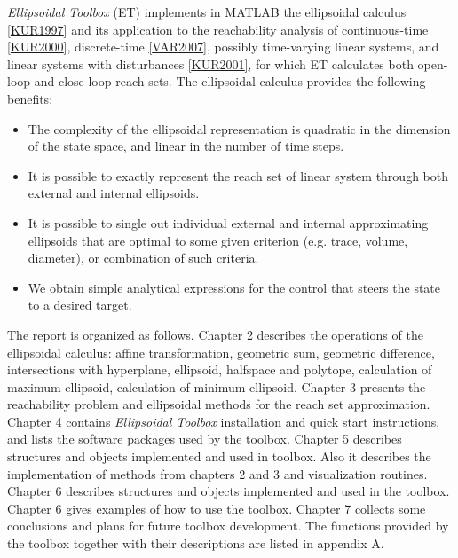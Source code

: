 \documentclass[letterpaper,10pt,english]{sphinxmanual}
\begin{document}
\emph{Ellipsoidal Toolbox} (ET) implements in MATLAB the ellipsoidal calculus
{\hyperref[chap_intro:kur1997]{{[}KUR1997{]}}} and its application to the reachability
analysis of continuous-time {\hyperref[chap_intro:kur2000]{{[}KUR2000{]}}}, discrete-time
{\hyperref[chap_reach:var2007]{{[}VAR2007{]}}}, possibly time-varying linear systems, and
linear systems with disturbances {\hyperref[chap_intro:kur2001]{{[}KUR2001{]}}},
for which ET calculates both open-loop and close-loop reach sets. The
ellipsoidal calculus provides the following benefits:
\begin{itemize}
\item {} 
The complexity of the ellipsoidal representation is quadratic in the
dimension of the state space, and linear in the number of time steps.

\item {} 
It is possible to exactly represent the reach set of linear system
through both external and internal ellipsoids.

\item {} 
It is possible to single out individual external and internal
approximating ellipsoids that are optimal to some given criterion
(e.g. trace, volume, diameter), or combination of such criteria.

\item {} 
We obtain simple analytical expressions for the control that steers
the state to a desired target.

\end{itemize}

The report is organized as follows. Chapter 2 describes the operations
of the ellipsoidal calculus: affine transformation, geometric sum,
geometric difference, intersections with hyperplane, ellipsoid,
halfspace and polytope, calculation of maximum ellipsoid, calculation of
minimum ellipsoid. Chapter 3 presents the reachability problem and
ellipsoidal methods for the reach set approximation. Chapter 4 contains
\emph{Ellipsoidal Toolbox} installation and quick start instructions, and
lists the software packages used by the toolbox. Chapter 5 describes
structures and objects implemented and used in toolbox. Also it
describes the implementation of methods from chapters 2 and 3 and
visualization routines. Chapter 6 describes structures and objects
implemented and used in the toolbox. Chapter 6 gives examples of how to
use the toolbox. Chapter 7 collects some conclusions and plans for
future toolbox development. The functions provided by the toolbox
together with their descriptions are listed in appendix A.
\end{document}
